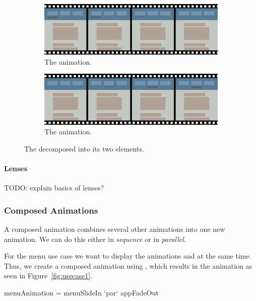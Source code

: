 \begin{figure}[h]
\centering

\begin{subfigure}[h]{\textwidth}
\centering
\includegraphics[width=\figscale\textwidth]{pictures/usecase2basic1}
\caption{The  animation.}
\label{fig:usecase2basic1}
\end{subfigure}

\begin{subfigure}[h]{\textwidth}
\centering
\includegraphics[width=\figscale\textwidth]{pictures/usecase2basic2}
\caption{The  animation.}
\label{fig:usecase2basic2}
\end{subfigure}

\caption{The  decomposed into its two elements.}
\label{fig:usecase2basic}
\end{figure}

\paragraph{Lenses} TODO: explain basics of lenses?

\subsubsection{Composed Animations}

A composed animation combines several other animations into one new animation. We can do this either in \emph{sequence} or in \emph{parallel}.

For the menu use case we want to display the animations  and  at the same time. Thus, we create a composed animation using ,  which results in the animation as seen in Figure~\ref{fig:usecase1}.

\begin{spec}
menuAnimation = menuSlideIn `par` appFadeOut
\end{spec}

